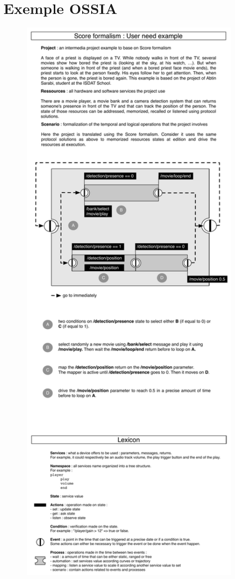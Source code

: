 	\chapter{Exemple OSSIA}
	\let\cleardoublepage\clearpage
	\label{apx.OSSIAExemple}
	\includegraphics[clip,trim=0cm 28cm 0cm 0cm, width=1.00\textwidth]{images/moineOSSIA.pdf}
